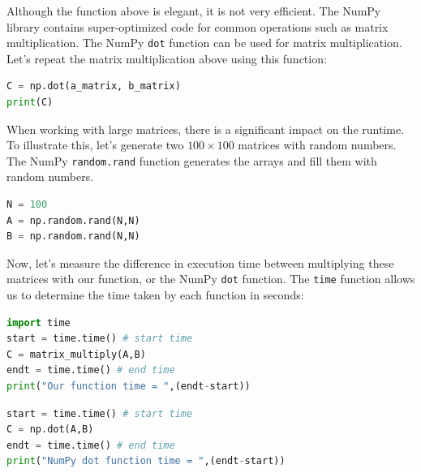 \documentclass[a4paper , 12pt]{book}
\newcommand{\code}[1]{\colorbox{light-gray}{\texttt{#1}}}
\begin{document}
Although the function above is elegant, it is not very efficient. The NumPy library contains super-optimized code for common operations such as matrix multiplication. The NumPy \code{dot} function can be used for matrix multiplication. Let's repeat the matrix multiplication above using this function:

\begin{center}
\begin{lstlisting}[language=Python, frame=single]
C = np.dot(a_matrix, b_matrix)
print(C)
\end{lstlisting}
\fbox{
\parbox{\textwidth - 2 \fboxsep}{
\*[[23  35]\\
 \*[53  83]\\
 \*[83 131]]
}}   
\end{center}

When working with large matrices, there is a significant impact on the runtime. To illustrate this, let's generate two $100\times 100$ matrices with random numbers. The NumPy \code{random.rand} function generates the arrays and fill them with random numbers.

\begin{center}
\begin{lstlisting}[language=Python, frame=single]
N = 100
A = np.random.rand(N,N)
B = np.random.rand(N,N)
\end{lstlisting}
\end{center}

Now, let's measure the difference in execution time between multiplying these matrices with our function, or the NumPy \code{dot} function. The \code{time} function allows us to determine the time taken by each function in seconds:

\begin{center}
\begin{lstlisting}[language=Python, frame=single]
import time
start = time.time() # start time
C = matrix_multiply(A,B)
endt = time.time() # end time
print("Our function time = ",(endt-start))
\end{lstlisting}
\end{center}

\begin{center}
\begin{lstlisting}[language=Python, frame=single]
start = time.time() # start time
C = np.dot(A,B)
endt = time.time() # end time
print("NumPy dot function time = ",(endt-start))
\end{lstlisting}
\end{center}
\end{document}
